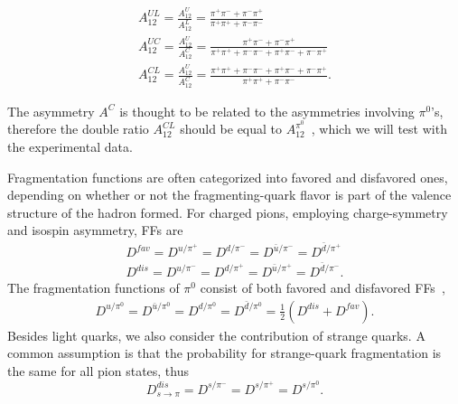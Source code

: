 \begin{equation}
\label{eqn:FF7}
\begin{aligned}
A_{12}^{UL}=\frac{A^{U}_{12}}{A^L_{12}}=\frac{\pi^+\pi^-+\pi^-\pi^+}{\pi^+\pi^++\pi^-\pi^-}\\
A_{12}^{UC}=\frac{A^{U}_{12}}{A^C_{12}}=\frac{\pi^+\pi^-+\pi^-\pi^+}{\pi^+\pi^++\pi^-\pi^-+\pi^+\pi^-+\pi^-\pi^+}\\
A_{12}^{CL}=\frac{A^{U}_{12}}{A^C_{12}}=\frac{\pi^+\pi^++\pi^-\pi^-+\pi^+\pi^-+\pi^-\pi^+}{\pi^+\pi^++\pi^-\pi^-}.
\end{aligned}
\end{equation}


The asymmetry $A^C$ is thought to be related to the asymmetries involving $\pi^0$'s, therefore the double ratio $A_{12}^{CL}$ should be equal to $A_{12}^{\pi^0}$~\cite{Efremov:2006qm}, 
which we will test with the experimental data.


Fragmentation functions are often categorized into favored and disfavored ones, depending on whether or not the fragmenting-quark flavor is part of the valence structure of the hadron formed. For charged pions, employing charge-symmetry and isospin asymmetry, FFs are 
\begin{equation}
\begin{aligned}
D^{fav}=D^{u/{\pi^+}}=D^{d/{\pi^-}}=D^{\bar{u}/{\pi^-}}=D^{\bar{d}/{\pi^+}}\\
D^{dis}=D^{u/{\pi^-}}=D^{d/{\pi^+}}=D^{\bar{u}/{\pi^+}}=D^{\bar{d}/{\pi^-}}.
\label{eqn:FF4}
\end{aligned}
\end{equation}
The fragmentation functions of $\pi^0$ consist of both favored and disfavored FFs~\cite{FoundationsofpQCD,Efremov:2006qm},
\begin{equation}
\begin{aligned}
D^{u/{\pi^0}}=D^{\bar{u}/{\pi^0}}=D^{d/{\pi^0}}=D^{\bar{d}/{\pi^0}}=\frac{1}{2}(D^{dis}+D^{fav}).
\label{eqn:FF4pi0}
\end{aligned}
\end{equation}
Besides light quarks, we also consider the contribution of strange quarks.
A common assumption is that the probability for strange-quark fragmentation is the same for all pion states, thus
\begin{equation}
D^{dis}_{s\rightarrow\pi}=D^{s/{\pi^-}}=D^{s/{\pi^+}}=D^{s/{\pi^0}}.
\end{equation}


